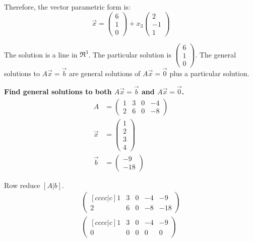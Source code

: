 \noindent
\newline
Therefore, the vector parametric form is:
\begin{equation}
    \Vec{x} = \begin{pmatrix}
        6 \\
        1 \\
        0
    \end{pmatrix} + x_3 \begin{pmatrix}
        2 \\
        -1 \\
        1
    \end{pmatrix}
\end{equation}

\noindent
The solution is a line in \(\Re^3\). The particular solution is \(\begin{pmatrix}
        6 \\
        1 \\
        0
\end{pmatrix}\). The general solutions to \(A\Vec{x}=\Vec{b}\) are general solutions of \(A\Vec{x}=\Vec{0}\) plus a particular solution.

\noindent
\newline
\textbf{Find general solutions to both \(A\Vec{x}=\Vec{b}\) and \(A\Vec{x}=\Vec{0}\).}
\begin{align}
    A&=\begin{pmatrix}
        1 & 3 & 0 & -4 \\
        2 & 6 & 0 & -8
    \end{pmatrix} \\
    \Vec{x} &= \begin{pmatrix}
        1 \\ 2 \\ 3 \\ 4
    \end{pmatrix} \\
    \Vec{b} &= \begin{pmatrix}
        -9 \\ -18
    \end{pmatrix}
\end{align}

\noindent
\newline
Row reduce \([A | b]\).
\begin{align}
    \begin{pmatrix}[cccc|c]
        1 & 3 & 0 & -4 & -9 \\
        2 & 6 & 0 & -8 & -18
    \end{pmatrix} \\
    \begin{pmatrix}[cccc|c]
        1 & 3 & 0 & -4 & -9 \\
        0 & 0 & 0 & 0 & 0
    \end{pmatrix}
\end{align}

